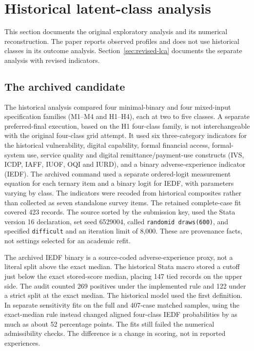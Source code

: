 \section{Historical latent-class analysis}
\label{sec:lca}
This section documents the original exploratory analysis and its numerical reconstruction. The paper reports observed profiles and does not use historical classes in its outcome analysis. Section~\ref{sec:revised-lca} documents the separate analysis with revised indicators.
\subsection{The archived candidate}
The historical analysis compared four minimal-binary and four mixed-input specification families (M1--M4 and H1--H4), each at two to five classes. A separate preferred-final execution, based on the H1 four-class family, is not interchangeable with the original four-class grid attempt. It used six three-category indicators for the historical vulnerability, digital capability, formal financial access, formal-system use, service quality and digital remittance/payment-use constructs (IVS, ICDP, IAFF, IUOF, OQI and IURD), and a binary adverse-experience indicator (IEDF). The archived command used a separate ordered-logit measurement equation for each ternary item and a binary logit for IEDF, with parameters varying by class. The indicators were recoded from historical composites rather than collected as seven standalone survey items. The retained complete-case fit covered 423 records. The source sorted by the submission key, used the Stata version 16 declaration, set seed 6529004, called \texttt{randomid draws(600)}, and specified \texttt{difficult} and an iteration limit of 8,000. These are provenance facts, not settings selected for an academic refit.

The archived IEDF binary is a source-coded adverse-experience proxy, not a literal split above the exact median. The historical Stata macro stored a cutoff just below the exact stored-score median, placing 147 tied records on the upper side. The audit counted 269 positives under the implemented rule and 122 under a strict split at the exact median. The historical model used the first definition. In separate sensitivity fits on the full and 407-case matched samples, using the exact-median rule instead changed aligned four-class IEDF probabilities by as much as about 52 percentage points. The fits still failed the numerical admissibility checks. The difference is a change in scoring, not in reported experiences.

